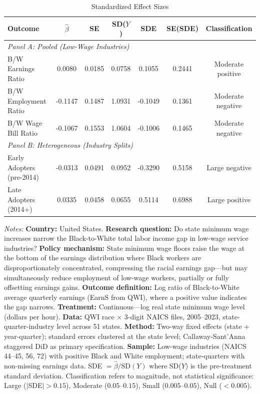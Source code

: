 \begin{table}[!htbp]
\centering
\caption{Standardized Effect Sizes}
\label{tab:sde}
\footnotesize
\begin{threeparttable}
\begin{tabular}{lcccccc}
\toprule
Outcome & $\hat{\beta}$ & SE & SD($Y$) & SDE & SE(SDE) & Classification \\
\midrule
\multicolumn{7}{l}{\textit{Panel A: Pooled (Low-Wage Industries)}} \\
B/W Earnings Ratio & 0.0080 & 0.0185 & 0.0758 & 0.1055 & 0.2441 & Moderate positive \\
B/W Employment Ratio & -0.1147 & 0.1487 & 1.0931 & -0.1049 & 0.1361 & Moderate negative \\
B/W Wage Bill Ratio & -0.1067 & 0.1553 & 1.0604 & -0.1006 & 0.1465 & Moderate negative \\
\midrule
\multicolumn{7}{l}{\textit{Panel B: Heterogeneous (Industry Splits)}} \\
Early Adopters (pre-2014) & -0.0313 & 0.0491 & 0.0952 & -0.3290 & 0.5158 & Large negative \\
Late Adopters (2014+) & 0.0335 & 0.0458 & 0.0655 & 0.5114 & 0.6988 & Large positive \\
\bottomrule
\end{tabular}
\begin{tablenotes}[flushleft]
\footnotesize\sloppy
\item \textit{Notes:} \textbf{Country:} United States. \textbf{Research question:} Do state minimum wage increases narrow the Black-to-White total labor income gap in low-wage service industries? \textbf{Policy mechanism:} State minimum wage floors raise the wage at the bottom of the earnings distribution where Black workers are disproportionately concentrated, compressing the racial earnings gap---but may simultaneously reduce employment of low-wage workers, partially or fully offsetting earnings gains. \textbf{Outcome definition:} Log ratio of Black-to-White average quarterly earnings (EarnS from QWI), where a positive value indicates the gap narrows. \textbf{Treatment:} Continuous---log real state minimum wage level (dollars per hour). \textbf{Data:} QWI race $\times$ 3-digit NAICS files, 2005--2023, state-quarter-industry level across 51 states. \textbf{Method:} Two-way fixed effects (state + year-quarter); standard errors clustered at the state level; Callaway-Sant'Anna staggered DiD as primary specification. \textbf{Sample:} Low-wage industries (NAICS 44--45, 56, 72) with positive Black and White employment; state-quarters with non-missing earnings data. SDE $= \hat{\beta} / \text{SD}(Y)$ where SD($Y$) is the pre-treatment standard deviation. Classification refers to magnitude, not statistical significance: Large ($|$SDE$| > 0.15$), Moderate ($0.05$--$0.15$), Small ($0.005$--$0.05$), Null ($< 0.005$).
\end{tablenotes}
\end{threeparttable}
\end{table}
